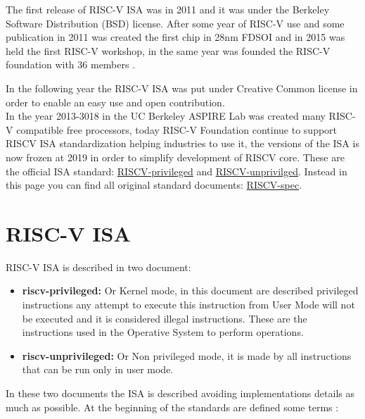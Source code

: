 {{	    The first release of RISC-V ISA was in 2011 and it was under the Berkeley Software Distribution (BSD) license. 
	    After some year of RISC-V use and some publication  in 2011 was created the first chip in 28nm FDSOI and in 2015 was held the first RISC-V workshop, in the same year was founded the RISC-V foundation with 36 members .
	    
	    In the following year the RISC-V ISA was put under Creative Common license in order to enable an easy use and open contribution.\\
	    
	    In the year 2013-3018 in the UC Berkeley ASPIRE Lab was created many RISC-V compatible free processors, today RISC-V Foundation continue to support RISCV ISA standardization helping industries to use it, the versions of the ISA is now frozen at 2019  in order to simplify development of RISCV core. 
	    These are the official ISA  standard: \href{https://github.com/riscv/riscv-isa-manual/releases/download/Ratified-IMFDQC-and-Priv-v1.11/riscv-privileged-20190608.pdf}{RISCV-privileged} and  \href{https://github.com/riscv/riscv-isa-manual/releases/download/Ratified-IMAFDQC/riscv-spec-20191213.pdf}{RISCV-unprivilged}. 
	    Instead in this page you can find all original standard documents: \href{https://riscv.org/technical/specifications/}{RISCV-spec}.
	}%

	\section{RISC-V ISA}{
	    RISC-V ISA is described in two document:
	    \begin{itemize}
	        \item \textbf{riscv-privileged:} Or Kernel mode, in this document are described privileged  instructions any attempt to execute this instruction from User Mode will not be executed and it is considered illegal instructions. These are the instructions used in the Operative System to perform operations.
	        \item \textbf{riscv-unprivileged:} Or Non privileged mode, it is made by all instructions that can be run only in user mode.
	    \end{itemize}
	    
	    In these two documents the ISA is described avoiding implementations details as much as possible. At the beginning of the standards are defined some terms :
	    
}}
